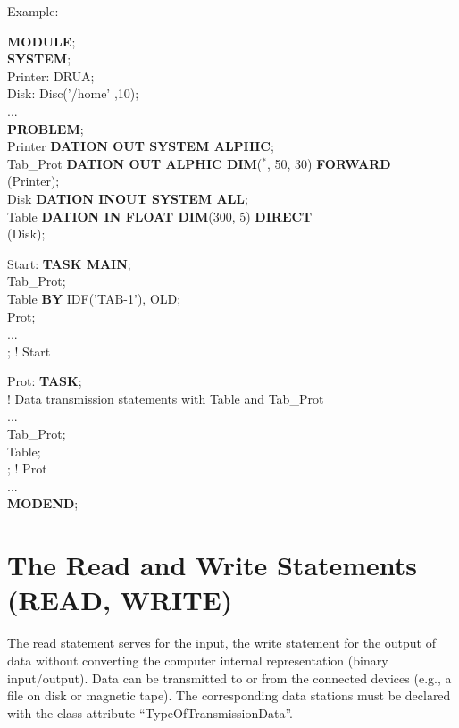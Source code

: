 Example:

{\bf MODULE};\\
{\bf SYSTEM};\\
\x Printer: DRUA;\\
\x Disk: Disc('/home' ,10);\\
\x ... \\
{\bf PROBLEM};\\
 Printer {\bf DATION OUT SYSTEM ALPHIC};\\
 Tab\_Prot {\bf DATION OUT ALPHIC DIM}($^*$, 50, 30) {\bf FORWARD}\\
\x {}(Printer);\\
 Disk {\bf DATION INOUT SYSTEM ALL};\\
 Table {\bf DATION IN FLOAT DIM}(300, 5) {\bf DIRECT}\\
\x {}(Disk);

Start: {\bf TASK MAIN};\\
 Tab\_Prot;\\
 Table {\bf BY} IDF('TAB-1'), OLD;\\
 Prot;\\
\x ...\\
; ! Start

Prot: {\bf TASK};\\
\x ! Data transmission statements with Table and Tab\_Prot\\
\x ...\\
 Tab\_Prot;\\
 Table; \\
; ! Prot \\
... \\
{\bf MODEND};

\section{The Read and Write Statements (READ, WRITE)}   %
\label{sec_read_write}

The read statement serves for the input, the write statement for the
output of data without converting the computer internal representation
(binary input/output). Data can be transmitted to or from the connected
devices (e.g., a file on disk or magnetic tape). The corresponding data
stations must be declared with the class attribute
``TypeOfTransmissionData''.


